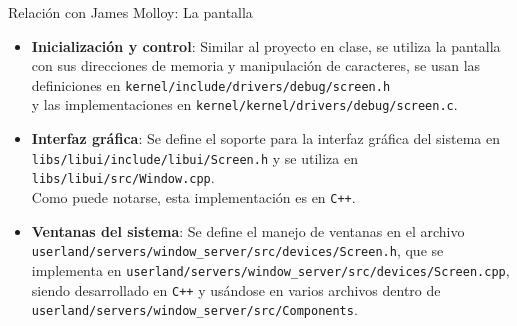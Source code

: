 \begin{frame}{Relación con James Molloy: La pantalla}
	\begin{itemize} \setlength\itemsep{0pt} \footnotesize
		\item \textbf{Inicialización y control}: Similar al proyecto en clase, se utiliza la pantalla con sus direcciones de memoria y manipulación de caracteres, se usan las definiciones en
		\texttt{kernel/include/drivers/debug/screen.h}\\
		y las implementaciones en 
		\texttt{kernel/kernel/drivers/debug/screen.c}.
		
		\item \textbf{Interfaz gráfica}: Se define el soporte para la interfaz gráfica del sistema en 
		\texttt{libs/libui/include/libui/Screen.h} y se utiliza en \\
		\texttt{libs/libui/src/Window.cpp}. \\
		Como puede notarse, esta implementación es en \texttt{C++}.
		
		
		\item \textbf{Ventanas del sistema}: Se define el manejo de ventanas en el archivo \texttt{userland/servers/window\_server/src/devices/Screen.h}, que se implementa en \texttt{userland/servers/window\_server/src/devices/Screen.cpp}, siendo desarrollado en \texttt{C++} y usándose en varios archivos dentro de\\ \texttt{userland/servers/window\_server/src/Components}.
	\end{itemize}
\end{frame}


